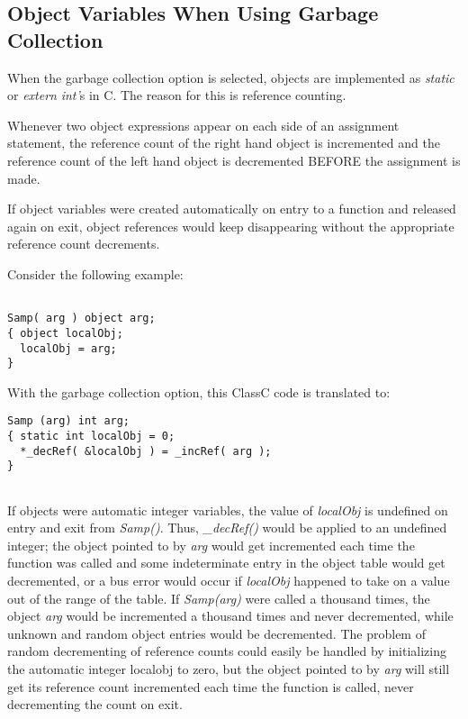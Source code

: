 \subsection{Object Variables When Using Garbage Collection}

When the garbage collection option is selected,
objects are implemented as
{\em static} or {\em extern} {\em int'}s in C.  The reason for this is
reference counting.

Whenever two object expressions appear on each side of an
assignment statement, the reference count of the right hand object is
incremented and the reference count of the left hand object is
decremented BEFORE the assignment is made.

If object variables were created automatically on
entry to a function and released again on exit, object references would
keep disappearing without the appropriate reference count decrements.
\vspace {2ex}

Consider the following example:
\begin{verbatim}

Samp( arg ) object arg;
{ object localObj;
  localObj = arg;
}
\end{verbatim}



With the garbage collection option, this ClassC code is translated to:

\begin{verbatim}
Samp (arg) int arg;
{ static int localObj = 0;
  *_decRef( &localObj ) = _incRef( arg );
}


\end{verbatim}
If objects were automatic integer variables, the value of {\em localObj} is
undefined on entry and exit from {\em Samp()}.  Thus, {\em \_decRef()} would
be applied to an undefined integer; the object pointed to by {\em arg} would
get incremented each time the function was called and some indeterminate
entry in the object table would get decremented, or a bus error would occur
if {\em localObj} happened to take on a value out of the range of the table.
If {\em Samp(arg)} were called a thousand times, the object {\em arg} would
be incremented a thousand times and never decremented, while unknown and
random object entries would be decremented.  The problem of random
decrementing of reference counts could easily be handled by initializing the
automatic integer localobj to zero, but the object pointed to by {\em arg}
will still get its reference count incremented each time the function is
called, never decrementing the count on exit.

